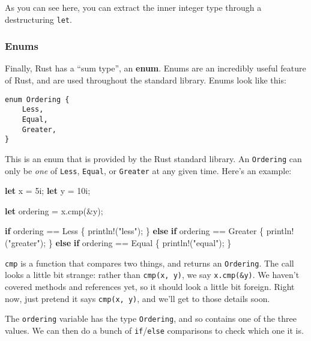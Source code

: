 \documentclass[]{article}
\newenvironment{Shaded}{}{}
\newcommand{\KeywordTok}[1]{\textcolor[rgb]{0.00,0.44,0.13}{\textbf{{#1}}}}
\newcommand{\DecValTok}[1]{\textcolor[rgb]{0.25,0.63,0.44}{{#1}}}
\newcommand{\StringTok}[1]{\textcolor[rgb]{0.25,0.44,0.63}{{#1}}}
\newcommand{\OtherTok}[1]{\textcolor[rgb]{0.00,0.44,0.13}{{#1}}}
\newcommand{\NormalTok}[1]{{#1}}
\begin{document}
As you can see here, you can extract the inner integer type through a
destructuring \texttt{let}.

\subsubsection{Enums}\label{enums}

Finally, Rust has a ``sum type'', an \textbf{enum}. Enums are an
incredibly useful feature of Rust, and are used throughout the standard
library. Enums look like this:

\begin{verbatim}
enum Ordering {
    Less,
    Equal,
    Greater,
}
\end{verbatim}

This is an enum that is provided by the Rust standard library. An
\texttt{Ordering} can only be \emph{one} of \texttt{Less},
\texttt{Equal}, or \texttt{Greater} at any given time. Here's an
example:

\begin{Shaded}
\begin{Highlighting}[]
\KeywordTok{let} \NormalTok{x = }\DecValTok{5i}\NormalTok{;}
\KeywordTok{let} \NormalTok{y = }\DecValTok{10i}\NormalTok{;}

\KeywordTok{let} \NormalTok{ordering = x.cmp(&y);}

\KeywordTok{if} \NormalTok{ordering == Less \{}
    \OtherTok{println!}\NormalTok{(}\StringTok{"less"}\NormalTok{);}
\NormalTok{\} }\KeywordTok{else} \KeywordTok{if} \NormalTok{ordering == Greater \{}
    \OtherTok{println!}\NormalTok{(}\StringTok{"greater"}\NormalTok{);}
\NormalTok{\} }\KeywordTok{else} \KeywordTok{if} \NormalTok{ordering == Equal \{}
    \OtherTok{println!}\NormalTok{(}\StringTok{"equal"}\NormalTok{);}
\NormalTok{\}}
\end{Highlighting}
\end{Shaded}

\texttt{cmp} is a function that compares two things, and returns an
\texttt{Ordering}. The call looks a little bit strange: rather than
\texttt{cmp(x, y)}, we say \texttt{x.cmp(\&y)}. We haven't covered
methods and references yet, so it should look a little bit foreign.
Right now, just pretend it says \texttt{cmp(x, y)}, and we'll get to
those details soon.

The \texttt{ordering} variable has the type \texttt{Ordering}, and so
contains one of the three values. We can then do a bunch of
\texttt{if}/\texttt{else} comparisons to check which one it is.
\end{document}
